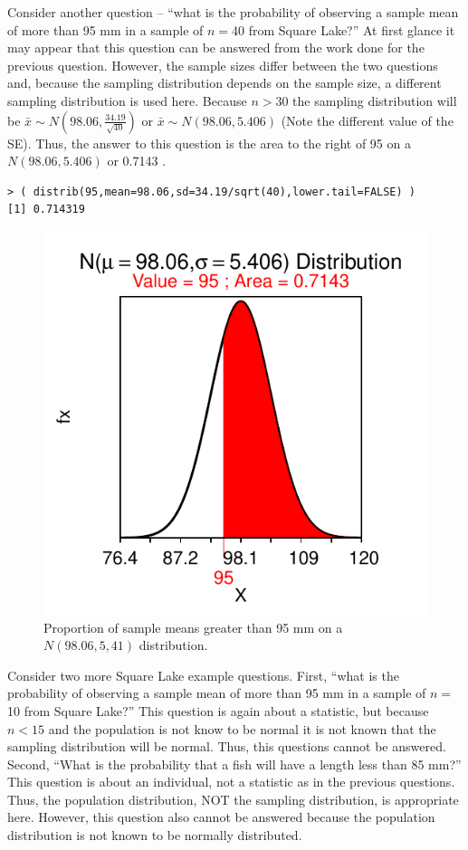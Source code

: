 \documentclass[10pt,openany]{book}\usepackage[]{graphicx}\usepackage[]{color}
\makeatletter
\newenvironment{kframe}{%
 \def\at@end@of@kframe{}%
 \ifinner\ifhmode%
  \def\at@end@of@kframe{\end{minipage}}%
  \begin{minipage}{\columnwidth}%
 \fi\fi%
 \def\FrameCommand##1{\hskip\@totalleftmargin \hskip-\fboxsep
 \colorbox{shadecolor}{##1}\hskip-\fboxsep
     \hskip-\linewidth \hskip-\@totalleftmargin \hskip\columnwidth}%
 \MakeFramed {\advance\hsize-\width
   \@totalleftmargin\z@ \linewidth\hsize
   \@setminipage}}%
 {\par\unskip\endMakeFramed%
 \at@end@of@kframe}
\newenvironment{knitrout}{}{} %
\makeatother
\begin{document}
Consider another question -- ``what is the probability of observing a sample mean of more than 95 mm in a sample of $n=$40 from Square Lake?''  At first glance it may appear that this question can be answered from the work done for the previous question.  However, the sample sizes differ between the two questions and, because the sampling distribution depends on the sample size, a different sampling distribution is used here.  Because $n>30$ the sampling distribution will be $\bar{x}\sim N(98.06,\frac{34.19}{\sqrt{40}})$ or $\bar{x}\sim N(98.06,5.406)$ (Note the different value of the SE).  Thus, the answer to this question is the area to the right of 95 on a $N(98.06,5.406)$ or 0.7143 .

\begin{knitrout}
\color{fgcolor}\begin{kframe}
\begin{verbatim}
> ( distrib(95,mean=98.06,sd=34.19/sqrt(40),lower.tail=FALSE) )
[1] 0.714319
\end{verbatim}
\end{kframe}\begin{figure}[hbtp]

{\centering \includegraphics[width=.4\linewidth]{Figs/NormTLgt95-1} 

}

\caption[Proportion of sample means greater than 95 mm on a $N(98.06,5,41)$ distribution]{Proportion of sample means greater than 95 mm on a $N(98.06,5,41)$ distribution.}\label{fig:NormTLgt95}
\end{figure}


\end{knitrout}


Consider two more Square Lake example questions.  First, ``what is the probability of observing a sample mean of more than 95 mm in a sample of $n=$10 from Square Lake?'' This question is again about a statistic, but because $n<15$ and the population is not know to be normal it is not known that the sampling distribution will be normal. Thus, this questions cannot be answered. Second, ``What is the probability that a fish will have a length less than 85 mm?''  This question is about an individual, not a statistic as in the previous questions.  Thus, the population distribution, NOT the sampling distribution, is appropriate here.  However, this question also cannot be answered because the population distribution is not known to be normally distributed.
\end{document}
